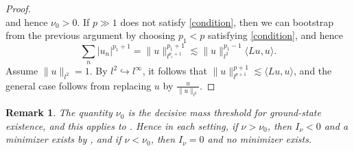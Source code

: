 \documentclass{article}
\numberwithin{equation}{section}
\newtheorem{remark}{Remark}[section]
\begin{document}
\begin{proof}
\begin{equation*}
\end{equation*}
and hence $\nu_0 > 0$. If $p \gg 1$ does not satisfy \eqref{condition}, then we can bootstrap from the previous argument by choosing $p_1 < p$ satisfying \eqref{condition}, and hence
\begin{equation}\label{bootstrap}
    \sum_n |u_n|^{p_1+1} = \| u \|_{l^{p_1+1}}^{p_1+1} \lesssim \| u \|_{l^{2}}^{p_1-1} \langle Lu,u \rangle.
\end{equation}
Assume $\| u \|_{l^2} = 1$. By $l^2 \hookrightarrow l^\infty$, it follows that $\| u \|_{l^{p+1}}^{p+1} \lesssim \langle Lu,u \rangle$, and the general case follows from replacing $u$ by $\frac{u}{\| u \|_{l^2}}$.
\end{proof}

\begin{remark}
The quantity $\nu_{0}$ is the decisive mass threshold for ground-state existence, and this applies to . Hence in each setting, if $\nu>\nu_{0}$, then $I_\nu<0$ and a minimizer exists by , and if $\nu<\nu_{0}$, then $I_\nu=0$ and no minimizer exists.    
\end{remark}
\end{document}
